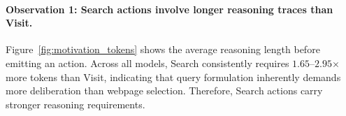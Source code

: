 \paragraph{Observation 1: Search actions involve longer reasoning traces than Visit.} 
Figure~\ref{fig:motivation_tokens} shows the average reasoning length before emitting an action. Across all models, Search consistently requires $1.65$--$2.95$$\times$ more tokens than Visit, indicating that query formulation inherently demands more deliberation than webpage selection. Therefore, Search actions carry stronger reasoning requirements.




